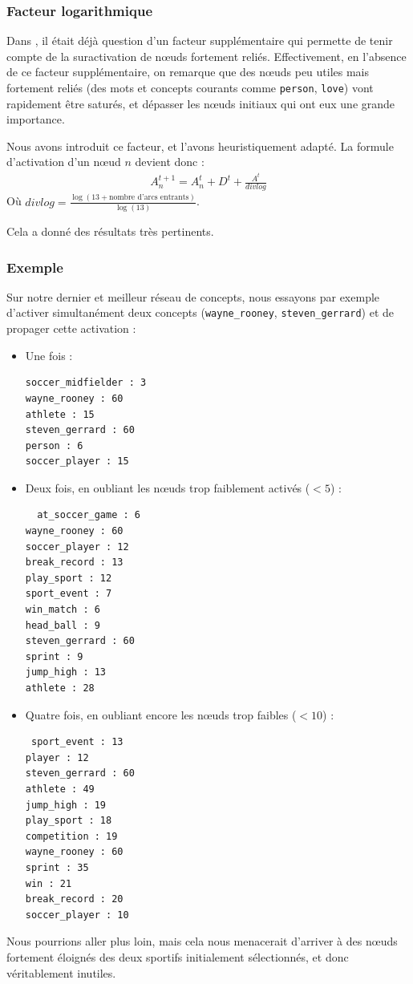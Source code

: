 \documentclass[a4paper, 12pt]{article}
\begin{document}
\subsubsection{Facteur logarithmique}
Dans \cite{parmentier_specification_1998}, il était déjà question d'un facteur supplémentaire qui permette de tenir compte de la suractivation de n\oe{}uds fortement reliés. Effectivement, en l'absence de ce facteur supplémentaire, on remarque que des n\oe{}uds peu utiles mais fortement reliés (des mots et concepts courants comme \verb|person|, \verb|love|) vont rapidement être saturés, et dépasser les n\oe{}uds initiaux qui ont eux une grande importance.

Nous avons introduit ce facteur, et l'avons heuristiquement adapté. La formule d'activation d'un n\oe{}ud $n$ devient donc :
\begin{align}
 A_n^{t+1} = A_n^t + D^t + \frac{A^t}{divlog}
\end{align}
Où $divlog = \frac{\log(13 + \text{nombre d'arcs entrants})}{\log(13)}$.

Cela a donné des résultats très pertinents.

\subsubsection{Exemple}

Sur notre dernier et meilleur réseau de concepts, nous essayons par exemple d'activer simultanément deux concepts (\verb|wayne_rooney|, \verb|steven_gerrard|) et de propager cette activation :
\begin{itemize}
 \item Une fois :
 \begin{verbatim}
soccer_midfielder : 3
wayne_rooney : 60
athlete : 15
steven_gerrard : 60
person : 6
soccer_player : 15
 \end{verbatim}
 \item Deux fois, en oubliant les n\oe{}uds trop faiblement activés ($ < 5$) :
 \begin{verbatim}
  at_soccer_game : 6
wayne_rooney : 60
soccer_player : 12
break_record : 13
play_sport : 12
sport_event : 7
win_match : 6
head_ball : 9
steven_gerrard : 60
sprint : 9
jump_high : 13
athlete : 28
 \end{verbatim}
\item Quatre fois, en oubliant encore les n\oe{}uds trop faibles ($ < 10$) :
\begin{verbatim}
 sport_event : 13
player : 12
steven_gerrard : 60
athlete : 49
jump_high : 19
play_sport : 18
competition : 19
wayne_rooney : 60
sprint : 35
win : 21
break_record : 20
soccer_player : 10
\end{verbatim}
\end{itemize}
Nous pourrions aller plus loin, mais cela nous menacerait d'arriver à des n\oe{}uds fortement éloignés des deux sportifs initialement sélectionnés, et donc véritablement inutiles.%
\end{document}
